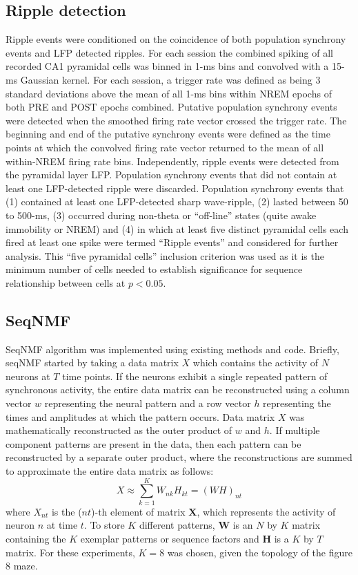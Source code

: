 \subsection{Ripple detection}

Ripple events were conditioned on the coincidence of both population synchrony events and LFP detected ripples. For each session the combined spiking of all recorded CA1 pyramidal cells was binned in 1-ms bins and convolved with a 15-ms Gaussian kernel. For each session, a trigger rate was defined as being 3 standard deviations above the mean of all 1-ms bins within NREM epochs of both PRE and POST epochs combined. Putative population synchrony events were detected when the smoothed firing rate vector crossed the trigger rate. The beginning and end of the putative synchrony events were defined as the time points at which the convolved firing rate vector returned to the mean of all within-NREM firing rate bins. Independently, ripple events were detected from the pyramidal layer LFP. Population synchrony events that did not contain at least one LFP-detected ripple were discarded. Population synchrony events that (1) contained at least one LFP-detected sharp wave-ripple, (2) lasted between 50 to 500-ms, (3) occurred during non-theta or ``off-line'' states (quite awake immobility or NREM) and (4) in which at least five distinct pyramidal cells each fired at least one spike were termed ``Ripple events'' and considered for further analysis. This ``five pyramidal cells'' inclusion criterion was used as it is the minimum number of cells needed to establish significance for sequence relationship between cells at $p < 0.05$.

\subsection{SeqNMF}

SeqNMF algorithm was implemented using existing methods and code. Briefly, seqNMF started by taking a data matrix $X$ which contains the activity of $N$ neurons at $T$ time points. If the neurons exhibit a single repeated pattern of synchronous activity, the entire data matrix can be reconstructed using a column vector $w$ representing the neural pattern and a row vector $h$ representing the times and amplitudes at which the pattern occurs. Data matrix $X$ was mathematically reconstructed as the outer product of $w$ and $h$. If multiple component patterns are present in the data, then each pattern can be reconstructed by a separate outer product, where the reconstructions are summed to approximate the entire data matrix as follows:
\[
X \approx \sum_{k=1}^K W_{nk} H_{kt} = (WH)_{nt}
\]
where $X_{nt}$ is the ($nt$)-th element of matrix $\mathbf{X}$, which represents the activity of neuron $n$ at time $t$. To store $K$ different patterns, $\mathbf{W}$ is an $N$ by $K$ matrix containing the $K$ exemplar patterns or sequence factors and $\mathbf{H}$ is a $K$ by $T$ matrix. For these experiments, $K = 8$ was chosen, given the topology of the figure 8 maze.

